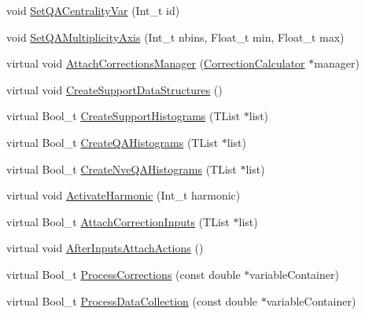 \begin{DoxyCompactItemize}
\item 
void \mbox{\hyperlink{classQn_1_1DetectorConfigurationChannels_ad7d7c25a2940f842783863ebf9a59fad}{Set\+Q\+A\+Centrality\+Var}} (Int\+\_\+t id)
\item 
void \mbox{\hyperlink{classQn_1_1DetectorConfigurationChannels_aaddda392786336026b2e91fb9d26a733}{Set\+Q\+A\+Multiplicity\+Axis}} (Int\+\_\+t nbins, Float\+\_\+t min, Float\+\_\+t max)
\item 
virtual void \mbox{\hyperlink{classQn_1_1DetectorConfigurationChannels_a074acfba4bc0d41df71d53b98d682f57}{Attach\+Corrections\+Manager}} (\mbox{\hyperlink{classQn_1_1CorrectionCalculator}{Correction\+Calculator}} $\ast$manager)
\item 
virtual void \mbox{\hyperlink{classQn_1_1DetectorConfigurationChannels_ab19e6fe4c194060859eef7941b1c716c}{Create\+Support\+Data\+Structures}} ()
\item 
virtual Bool\+\_\+t \mbox{\hyperlink{classQn_1_1DetectorConfigurationChannels_a68e68df13b56e3e9f55adc8cae0a505d}{Create\+Support\+Histograms}} (T\+List $\ast$list)
\item 
virtual Bool\+\_\+t \mbox{\hyperlink{classQn_1_1DetectorConfigurationChannels_a0e3a0e4775decda04c3bad48534c297a}{Create\+Q\+A\+Histograms}} (T\+List $\ast$list)
\item 
virtual Bool\+\_\+t \mbox{\hyperlink{classQn_1_1DetectorConfigurationChannels_a62452177f5059e64977c5c1fc079de0b}{Create\+Nve\+Q\+A\+Histograms}} (T\+List $\ast$list)
\item 
virtual void \mbox{\hyperlink{classQn_1_1DetectorConfigurationChannels_a6e0cb5f19763dd57e017325d456adb39}{Activate\+Harmonic}} (Int\+\_\+t harmonic)
\item 
virtual Bool\+\_\+t \mbox{\hyperlink{classQn_1_1DetectorConfigurationChannels_ac02f3bf7815650e06a3b85f3c0bcd0e0}{Attach\+Correction\+Inputs}} (T\+List $\ast$list)
\item 
virtual void \mbox{\hyperlink{classQn_1_1DetectorConfigurationChannels_aee41ab7c778ea075aa7e4f414c8817e0}{After\+Inputs\+Attach\+Actions}} ()
\item 
virtual Bool\+\_\+t \mbox{\hyperlink{classQn_1_1DetectorConfigurationChannels_a327a2d868d9cc1596e83f54354c3df44}{Process\+Corrections}} (const double $\ast$variable\+Container)
\item 
virtual Bool\+\_\+t \mbox{\hyperlink{classQn_1_1DetectorConfigurationChannels_a972f2cc50810d2a9651f2920de5a03ec}{Process\+Data\+Collection}} (const double $\ast$variable\+Container)
\item 

\end{DoxyCompactItemize}
